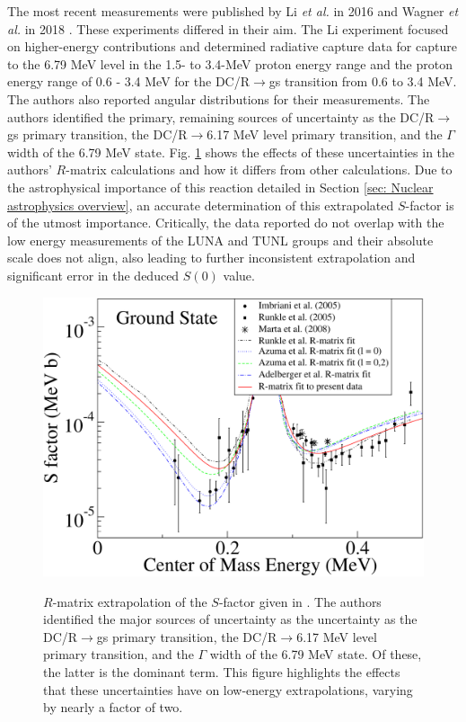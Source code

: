 The most recent measurements were published by Li \textit{et al.} in 2016 \cite{Li2016} and Wagner \textit{et al.} in 2018 \cite{Wagner2018}. These experiments differed in their aim. The Li experiment focused on higher-energy contributions and determined radiative capture data for capture to the 6.79 MeV level in the 1.5- to 3.4-MeV proton energy range and the proton energy range of 0.6 - 3.4 MeV for the DC/R$\rightarrow$gs transition from 0.6 to 3.4 MeV. The authors also reported angular distributions for their measurements. The authors identified the primary, remaining sources of uncertainty as the DC/R$\rightarrow$gs primary transition, the DC/R$\rightarrow$6.17 MeV level primary transition, and the $\Gamma$ width of the 6.79 MeV state. Fig. \ref{fig: QianRmatrix} shows the effects of these uncertainties in the authors' $R$-matrix calculations and how it differs from other calculations. Due to the astrophysical importance of this reaction detailed in Section \ref{sec: Nuclear astrophysics overview}, an accurate determination of this extrapolated $S$-factor is of the utmost importance. Critically, the data reported do not overlap with the low energy measurements of the LUNA and TUNL groups and their absolute scale does not align, also leading to further inconsistent extrapolation and significant error in the deduced $S(0)$ value.

\begin{figure}
\includegraphics[width=\linewidth]{figures/qianSfactor.pdf}
\label{fig: QianRmatrix}
\caption{$R$-matrix extrapolation of the $S$-factor given in \cite{Li2016}. The authors identified the major sources of uncertainty as the uncertainty as the DC/R$\rightarrow$gs primary transition, the DC/R$\rightarrow$6.17 MeV level primary transition, and the $\Gamma$ width of the 6.79 MeV state. Of these, the latter is the dominant term. This figure highlights the effects that these uncertainties have on low-energy extrapolations, varying by nearly a factor of two. }
\end{figure}

